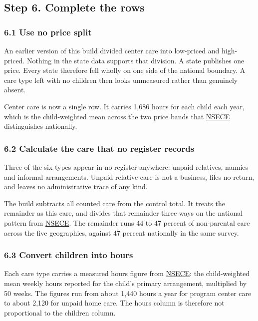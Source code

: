 \documentclass[11pt]{article}
\begin{document}
\subsection*{Step 6. Complete the rows}

\subsubsection*{6.1 Use no price split}

An earlier version of this build divided center care into low-priced and
high-priced. Nothing in the state data supports that division. A state publishes
one price. Every state therefore fell wholly on one side of the national
boundary. A care type left with no children then looks unmeasured rather than
genuinely absent.

Center care is now a single row. It carries 1,686 hours for each child each year,
which is the child-weighted mean across the two price bands that
\href{https://www.icpsr.umich.edu/web/ICPSR/studies/37941}{NSECE} distinguishes
nationally.

\subsubsection*{6.2 Calculate the care that no register records}

Three of the six types appear in no register anywhere: unpaid relatives, nannies
and informal arrangements. Unpaid relative care is not a business, files no
return, and leaves no administrative trace of any kind.

The build subtracts all counted care from the control total. It treats the
remainder as this care, and divides that remainder three ways on the national
pattern from
\href{https://www.icpsr.umich.edu/web/ICPSR/studies/37941}{NSECE}. The remainder
runs 44 to 47 percent of non-parental care across the five geographies, against
47 percent nationally in the same survey.

\subsubsection*{6.3 Convert children into hours}

Each care type carries a measured hours figure from
\href{https://www.icpsr.umich.edu/web/ICPSR/studies/37941}{NSECE}: the
child-weighted mean weekly hours reported for the child's primary arrangement,
multiplied by 50 weeks. The figures run from about 1,440 hours a year for program center care to about
2,120 for unpaid home care. The hours column is therefore not proportional to
the children column.
\end{document}
